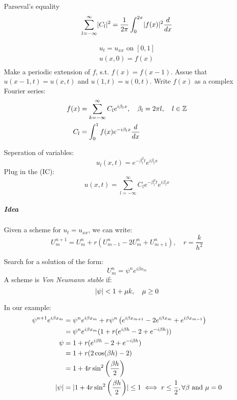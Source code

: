 \begin{theorem}{Parseval's equality}{}
  \[
    \sum_{l=-\infty}^{\infty} \lvert C_l\rvert^2 = \frac{1}{2\pi} \int_0^{2\pi} \lvert f(x)\rvert^2 \frac{d}{d{x}}
  \]
\end{theorem}

\begin{example}{}{}
  \begin{align*}
    u_t = u_{xx} \text{ on } [0,1] \\
    u(x, 0) = f(x)                 \\
  \end{align*}
  Make a periodic extension of \(f\), s.t. \(f(x) = f(x-1)\).
  Assue that \(u(x-1, t) = u(x, t)\) and \(u(1, t) = u(0, t)\).
  Write \(f(x)\) as a complex Fourier series:
  \begin{align*}
    f(x) & = \sum_{k=-\infty}^{\infty} C_l e^{i \beta_l x}, \quad \beta_l = 2\pi l, \quad l \in \mathbb{Z} \\
    C_l  & = \int_0^1 f(x) e^{-i \beta_l x} \frac{d}{d{x}}
  \end{align*}

  Seperation of variables:
  \[
    u_l(x, t) = e^{-\beta_l^2 t} e^{i \beta_l x}
  \]
  Plug in the (IC):
  \[
    u(x, t) = \sum_{l=-\infty}^{\infty} C_l e^{-\beta_l^2 t} e^{i \beta_l x}
  \]
  \subparagraph{Idea}
  Given a scheme for \(u_t = u_{xx}\), we can write:
  \[
    U_m^{n+1} = U_m^n + r(U_{m-1}^n - 2U_m^n + U_{m+1}^n), \quad r = \frac{k}{h^2}
  \]

  Search for a solution of the form:
  \[
    U_m^n = \psi^n e^{i \beta x_m}
  \]
  A scheme is \textit{Von Neumann stable} if:
  \[
    \lvert\psi\rvert < 1 + \mu k, \quad \mu \geq 0
  \]

  In our example:
  \begin{align*}
    \psi^{n+1} e^{i \beta x_m} & = \psi^n e^{i \beta x_m} + r\psi^n\left(e^{i \beta x_{m+1}} - 2e^{i \beta x_m} + e^{i \beta x_{m-1}}\right)           \\
                               & = \psi^n e^{i \beta x_m} (1 + r(e^{i \beta h} - 2 + e^{-i \beta h}))                                                  \\
    \psi                       & = 1 + r(e^{i \beta h} - 2 + e^{-i \beta h})                                                                           \\
                               & = 1 + r(2\cos(\beta h) - 2)                                                                                           \\
                               & = 1 + 4r\sin^2\left(\frac{\beta h}{2}\right)                                                                          \\
    \lvert\psi\rvert                 & = \lvert1 + 4r\sin^2\left(\frac{\beta h}{2}\right)\rvert \leq 1 \iff r \leq \frac{1}{2}, \forall \beta \text{ and } \mu = 0
  \end{align*}
\end{example}
